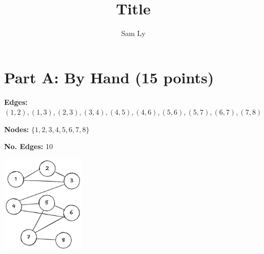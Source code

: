 \documentclass{article}
\title{Title}
\author{Sam Ly}
\begin{document}
\maketitle

\section*{Part A: By Hand (15 points)}

\textbf{Edges:} \((1,2), (1,3), (2,3), (3,4), (4,5), (4,6), (5,6), (5,7), (6,7), (7,8)\)

\noindent\textbf{Nodes:} \(\{1,2,3,4,5,6,7,8\}\)

\noindent \textbf{No. Edges:} 10

\begin{center}
    \includegraphics[width=0.3\textwidth]{figures/main_graph.png}
\end{center}
\end{document}
